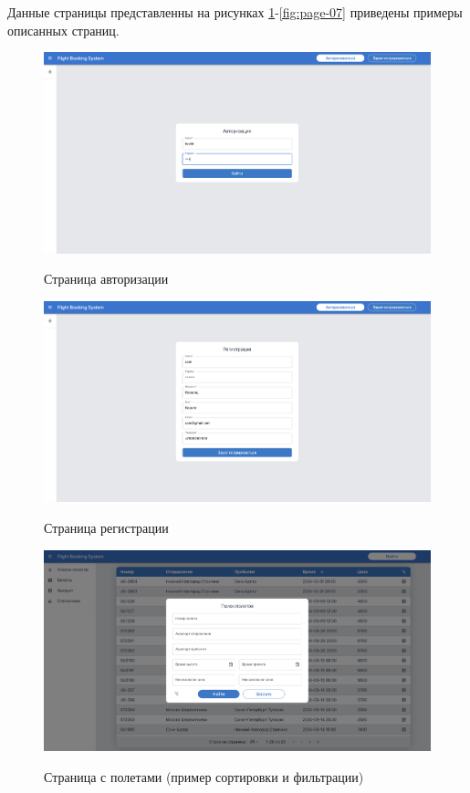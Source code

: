 Данные страницы представленны на рисунках \ref{fig:page-01}-\ref{fig:page-07} приведены примеры описанных страниц.

\begin{figure}[H]
	\begin{center}
		{\includegraphics[scale = 0.25]{../img/pages/page-01.png}}
		\caption{Страница авторизации}
		\label{fig:page-01}
	\end{center}
\end{figure}

\begin{figure}[H]
	\begin{center}
		{\includegraphics[scale = 0.25]{../img/pages/page-02.png}}
		\caption{Страница регистрации}
		\label{fig:page-02}
	\end{center}
\end{figure}

\begin{figure}[H]
	\begin{center}
		{\includegraphics[scale = 0.25]{../img/pages/page-03.png}}
		\caption{Страница с полетами (пример сортировки и фильтрации)}
		\label{fig:page-03}
	\end{center}
\end{figure}

